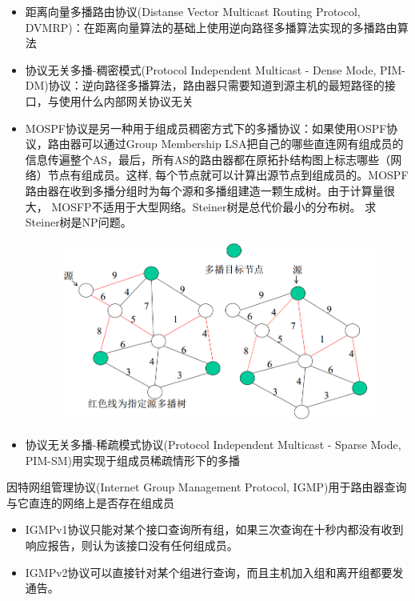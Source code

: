 \myhline
\begin{itemize}
	\item 距离向量多播路由协议(Distanse	Vector Multicast Routing Protocol, DVMRP)：在距离向量算法的基础上使用逆向路径多播算法实现的多播路由算法
	\item 协议无关多播-稠密模式(Protocol Independent Multicast - Dense Mode, PIM-DM)协议：逆向路径多播算法，路由器只需要知道到源主机的最短路径的接口，与使用什么内部网关协议无关
	\item MOSPF协议是另一种用于组成员稠密方式下的多播协议：如果使用OSPF协议，路由器可以通过Group Membership LSA把自己的哪些直连网有组成员的信息传遍整个AS，最后，所有AS的路由器都在原拓扑结构图上标志哪些（网络）节点有组成员。这样, 每个节点就可以计算出源节点到组成员的。MOSPF路由器在收到多播分组时为每个源和多播组建造一颗生成树。由于计算量很大， MOSFP不适用于大型网络。Steiner树是总代价最小的分布树。 求Steiner树是NP问题。
	\begin{figure}[H]
		\centering
		\includegraphics[width=0.6\linewidth]{fig/MOSPF.png}
	\end{figure}
	\item 协议无关多播-稀疏模式协议(Protocol Independent Multicast - Sparse Mode, PIM-SM)用实现于组成员稀疏情形下的多播
\end{itemize}

\myhline
因特网组管理协议(Internet Group Management Protocol, IGMP)用于路由器查询与它直连的网络上是否存在组成员
\begin{itemize}
	\item IGMPv1协议只能对某个接口查询所有组，如果三次查询在十秒内都没有收到响应报告，则认为该接口没有任何组成员。
	\item IGMPv2协议可以直接针对某个组进行查询，而且主机加入组和离开组都要发通告。
\end{itemize}